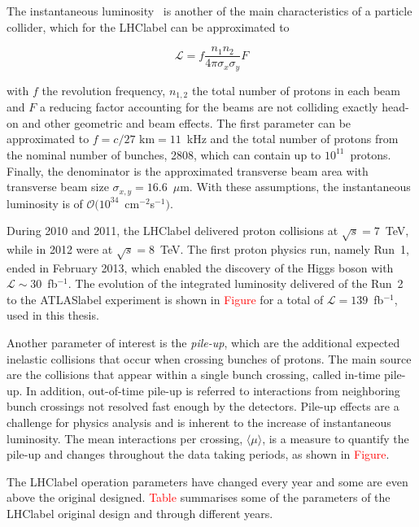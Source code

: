 The instantaneous luminosity~\cite{luminosity} is another of the main characteristics of a particle collider, which for the \acrshort{LHClabel} can be approximated to

\begin{equation}
    \mathcal{L} = f \frac{n_1n_2}{4\pi\sigma_x\sigma_y} F
\end{equation}

with $f$ the revolution frequency, $n_{1,2}$ the total number of protons in each beam and $F$ a reducing factor accounting for the beams are not colliding exactly head-on and other geometric and beam effects. The first parameter can be approximated to $f=c/27\text{ km} = 11$~kHz and the total number of protons from the nominal number of bunches, 2808, which can contain up to $10^{11}$~protons. Finally, the denominator is the approximated transverse beam area with transverse beam size $\sigma_{x,y} = 16.6$~$\mu$m. With these assumptions, the instantaneous luminosity is of $\mathcal{O}(10^{34}$~cm$^{-2}$s$^{-1})$.

During 2010 and 2011, the \acrshort{LHClabel} delivered proton collisions at $\sqrt{s}=7$~TeV, while in 2012 were at $\sqrt{s}=8$~TeV. The first proton physics run, namely Run~1, ended in February 2013, which enabled the discovery of the Higgs boson with $\mathscr{L}\sim30$~fb$^{-1}$. The evolution of the integrated luminosity delivered of the Run~2 to the \acrshort{ATLASlabel} experiment is shown in \textcolor{red}{Figure} for a total of $\mathscr{L}=139$~fb$^{-1}$, used in this thesis.

Another parameter of interest is the \textit{pile-up}, which are the additional expected inelastic collisions that occur when crossing bunches of protons. The main source are the collisions that appear within a single bunch crossing, called in-time pile-up. In addition, out-of-time pile-up is referred to interactions from neighboring bunch crossings not resolved fast enough by the detectors. Pile-up effects are a challenge for physics analysis and is inherent to the increase of instantaneous luminosity. The mean interactions per crossing, $\langle\mu\rangle$, is a measure to quantify the pile-up and changes throughout the data taking periods, as shown in \textcolor{red}{Figure}.

The \acrshort{LHClabel} operation parameters have changed every year and some are even above the original designed. \textcolor{red}{Table} summarises some of the parameters of the \acrshort{LHClabel} original design and through different years.


